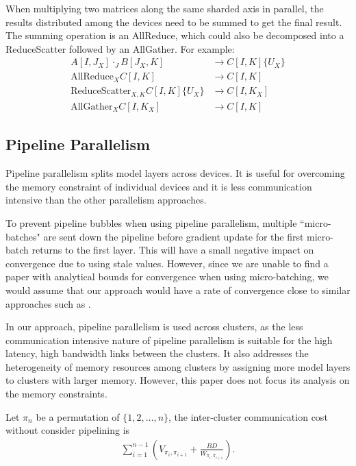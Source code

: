 \documentclass{article}
\begin{document}
When multiplying two matrices along the same sharded axis in parallel, the results distributed among the devices need to be summed to get the final result. The summing operation is an AllReduce, which could also be decomposed into a ReduceScatter followed by an AllGather. For example:
\begin{align*}
    A[I, J_X] \cdot_J B[J_X, K] &\to C[I, K]\{U_X\} \\
    \text{AllReduce}_{X} C[I, K] &\to C[I, K] \\
    \text{ReduceScatter}_{X, K} C[I, K]\{U_X\} &\to C[I, K_X] \\
    \text{AllGather}_X C[I, K_X] &\to C[I, K]
\end{align*}

\subsection{Pipeline Parallelism}

Pipeline parallelism splits model layers across devices. It is useful for overcoming the memory constraint of individual devices and it is less communication intensive than the other parallelism approaches.

To prevent pipeline bubbles when using pipeline parallelism, multiple ``micro-batches" are sent down the pipeline before gradient update for the first micro-batch returns to the first layer. This will have a small negative impact on convergence due to using stale values. However, since we are unable to find a paper with analytical bounds for convergence when using micro-batching, we would assume that our approach would have a rate of convergence close to similar approaches such as \cite{ye2024asteroid}.

In our approach, pipeline parallelism is used across clusters, as the less communication intensive nature of pipeline parallelism is suitable for the high latency, high bandwidth links between the clusters. It also addresses the heterogeneity of memory resources among clusters by assigning more model layers to clusters with larger memory. However, this paper does not focus its analysis on the memory constraints.

Let $\pi_n$ be a permutation of $\{1, 2, \dots, n\}$, the inter-cluster communication cost without consider pipelining is
\begin{align}
    \sum_{i=1}^{n-1} \left(V_{\pi_{i}, \pi_{i + 1}} + \frac{BD}{W_{\pi_{i}, \pi_{i + 1}}}\right).
\end{align}
\end{document}
